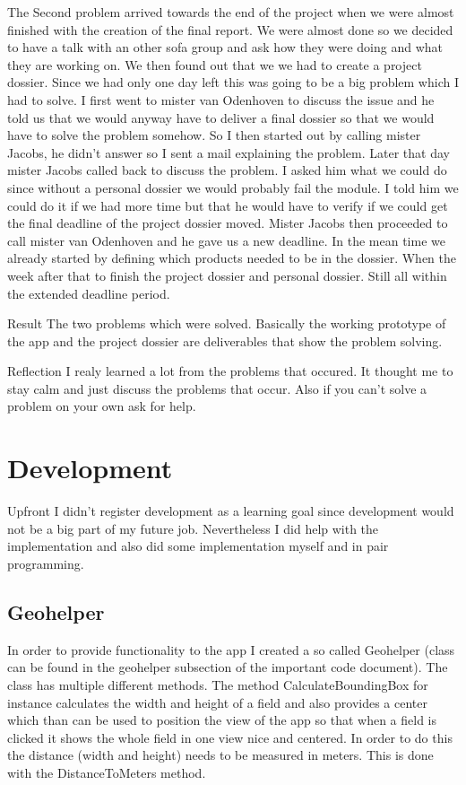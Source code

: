 \documentclass[12pt]{article}
\begin{document}
\begin{STAR}
	    The Second problem arrived towards the end of the project when we were almost finished with the creation of the final report. We were almost done so we decided to have a talk with an other sofa group and ask how they were doing and what they are working on. We then found out that we we had to create a project dossier. Since we had only one day left this was going to be a big problem which I had to solve. I first went to mister van Odenhoven to discuss the issue and he told us that we would anyway have to deliver a final dossier so that we would have to solve the problem somehow. So I then started out by calling mister Jacobs, he didn't answer so I sent a mail explaining the problem. Later that day mister Jacobs called back to discuss the problem. I asked him what we could do since without a personal dossier we would probably fail the module. I told him we could do it if we had more time but that he would have to verify if we could get the final deadline of the project dossier moved. Mister Jacobs then proceeded to call mister van Odenhoven and he gave us a new deadline. In the mean time we already started by defining which products needed to be in the dossier. When the week after that to finish the project dossier and personal dossier. Still all within the extended deadline period.
	    \item[Result] The two problems which were solved. Basically the working prototype of the app and the project dossier are deliverables that show the problem solving.
	    \item[Reflection] I realy learned a lot from the problems that occured. It thought me to stay calm and just discuss the problems that occur. Also if you can't solve a problem on your own ask for help.
	\end{STAR}
	\clearpage
	
	\section{Development}
	Upfront I didn't register development as a learning goal since development would not be a big part of my future job. Nevertheless I did help with the implementation and also did some implementation myself and in pair programming.
	
	\subsection{Geohelper}
	In order to provide functionality to the app I created a so called Geohelper (class can be found in the geohelper subsection of the important code document). The class has multiple different methods. The method CalculateBoundingBox for instance calculates the width and height of a field and also provides a center which than can be used to position the view of the app so that when a field is clicked it shows the whole field in one view nice and centered. In order to do this the distance (width and height) needs to  be measured in meters. This is done with the DistanceToMeters method.
	
\end{document}
